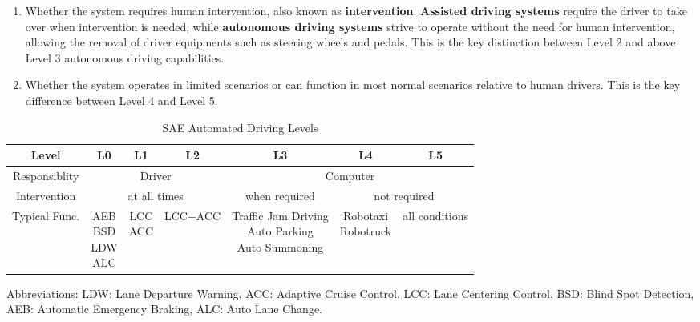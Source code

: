 \begin{enumerate}
\item Whether the system requires human intervention, also known as \textbf{intervention}. \textbf{Assisted driving systems} require the driver to take over when intervention is needed, while \textbf{autonomous driving systems} strive to operate without the need for human intervention, allowing the removal of driver equipments such as steering wheels and pedals. This is the key distinction between Level 2 and above Level 3 autonomous driving capabilities.
\item Whether the system operates in limited scenarios or can function in most normal scenarios relative to human drivers. This is the key difference between Level 4 and Level 5.
\end{enumerate}

\begin{table}[h]
	\footnotesize
	\caption{SAE Automated Driving Levels}
	\label{table:SAE}
	\centering
	\begin{threeparttable}
	\begin{tabular}{|c|ccc|ccc|}
		\hline Level & L0 & L1 & L2 & L3 & L4 & L5 \\\hline
		Responsiblity & \multicolumn{3}{c}{Driver} & \multicolumn{3}{c|}{Computer} \\\hline
		Intervention & \multicolumn{3}{c|}{at all times} & when required & \multicolumn{2}{|c|}{not required} \\\hline
		Typical Func. & \makecell[l]{AEB\\BSD\\ LDW \\ ALC} & \makecell[l]{LCC\\ACC} & LCC+ACC & \makecell[l]{Traffic Jam Driving\\Auto Parking\\Auto Summoning} & \makecell[c]{Robotaxi\\Robotruck} & all conditions \\\hline
	\end{tabular}
	\begin{tablenotes}
	\item Abbreviations: LDW: Lane Departure Warning, ACC: Adaptive Cruise Control, LCC: Lane Centering Control, BSD: Blind Spot Detection, AEB: Automatic Emergency Braking, ALC: Auto Lane Change.
	\end{tablenotes}
	\end{threeparttable}
\end{table}

